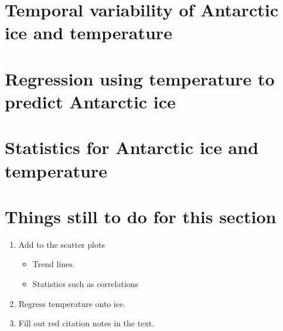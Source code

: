 \documentclass[../main.tex]{subfiles}
\begin{document}
\section{Temporal variability of Antarctic ice and temperature}

\section{Regression using temperature to predict Antarctic ice}

\section{Statistics for Antarctic ice and temperature}

\section*{Things still to do for this section}
\begin{enumerate}
    \item Add to the scatter plots
    \begin{itemize}
        \item Trend lines.
        \item Statistics such as correlations
    \end{itemize}
    \item Regress temperature onto ice.
    \item Fill out red citation notes in the text.
\end{enumerate}
\end{document}
